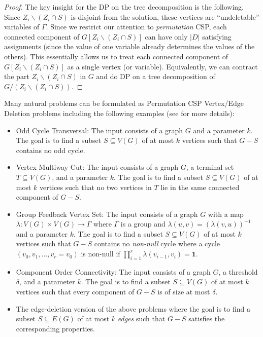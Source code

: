 \documentclass[a4paper,11pt]{article}
\numberwithin{lemma}{section}
\begin{document}
\begin{proof}
 The key insight for the DP on the tree decomposition is the following.
 Since $Z_i \backslash (Z_i \cap S)$ is disjoint from the solution, these vertices are ``undeletable'' variables of $\varGamma$.
 Since we restrict our attention to \emph{permutation} CSP, each connected component of $G[Z_i \backslash (Z_i \cap S)]$ can have only $|D|$ satisfying assignments (since the value of one variable already determines the values of the others).
 This essentially allows us to treat each connected component of $G[Z_i \backslash (Z_i \cap S)]$ as a single vertex (or variable).
 Equivalently, we can contract the part $Z_i \backslash (Z_i \cap S)$ in $G$ and do DP on a tree decomposition of $G/(Z_i \backslash (Z_i \cap S))$.
\end{proof}

Many natural problems can be formulated as {\sc Permutation CSP Vertex/Edge Deletion} problems including the following examples (see \cite{MarxMNT22} for more details):
\begin{itemize}
 \item {\sc Odd Cycle Transversal}: The input consists of a graph $G$ and a parameter $k$. The goal is to find a subset $S \subseteq V(G)$ of at most $k$ vertices such that $G - S$ contains no odd cycle.
 \item {\sc Vertex Multiway Cut}: The input consists of a graph $G$, a terminal set $T \subseteq V(G)$, and a parameter $k$. The goal is to find a subset $S \subseteq V(G)$ of at most $k$ vertices such that no two vertices in $T$ lie in the same connected component of $G - S$.
 \item {\sc Group Feedback Vertex Set}: The input consists of a graph $G$ with a map $\lambda:V(G) \times V(G) \rightarrow \varGamma$ where $\varGamma$ is a group and $\lambda(u,v) = (\lambda(v,u))^{-1}$ and a parameter $k$. The goal is to find a subset $S \subseteq V(G)$ of at most $k$ vertices such that $G - S$ contains no \emph{non-null} cycle where a cycle $(v_0,v_1,\dots,v_r=v_0)$ is non-null if $\prod_{i=1}^r \lambda(v_{i-1},v_i) = \mathbf{1}$.
 \item {\sc Component Order Connectivity}: The input consists of a graph $G$, a threshold $\delta$, and a parameter $k$. The goal is to find a subset $S \subseteq V(G)$ of at most $k$ vertices such that every component of $G-S$ is of size at most $\delta$.
 \item The edge-deletion version of the above problems where the goal is to find a subset $S \subseteq E(G)$ of at most $k$ \emph{edges} such that $G-S$ satisfies the corresponding properties.
\end{itemize}
\end{document}
